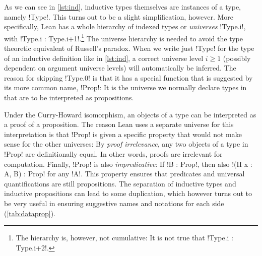 As we can see in \autoref{lst:ind}, inductive types themselves are instances of
a type, namely \lean!Type!. This turns out to be a slight simplification,
however. More specifically, Lean has a whole hierarchy of indexed types
or \emph{universes} \lean!Type.{i}!, with \lean!Type.{i} :
Type.{i+1}!.\footnote{The hierarchy is, however, not cumulative: It is not true
  that \lean!Type.{i} : Type.{i+2}!.} The universe hierarchy is needed to avoid
the type theoretic equivalent of Russell's paradox. When we write just
\lean!Type! for the type of an inductive definition like in \autoref{lst:ind},
a correct universe level $i \ge 1$
(possibly dependent on argument universe levels) will automatically be inferred.
The reason for skipping \lean!Type.{0}! is that it has a special function that
is suggested by its more common name, \lean!Prop!: It is the universe we normally
declare types in that are to be interpreted as propositions.

Under the Curry-Howard isomorphism, an objects of a type can be interpreted as
a proof of a proposition. The reason Lean uses a separate universe for this
interpretation is that \lean!Prop! is given a specific property that would not
make sense for the other universes: By \emph{proof irrelevance}, any two
objects of a type in \lean!Prop! are definitionally equal. In other words,
proofs are irrelevant for computation. Finally, \lean!Prop! is also
\emph{impredicative}: If \lean!B : Prop!, then also \lean!(Π x : A, B) : Prop!
for any \lean!A!. This property ensures that predicates and universal
quantifications are still propositions.
The separation of inductive types and inductive propositions can lead to some duplication, which
however turns out to be very useful in ensuring suggestive names and notations
for each side (\autoref{tab:dataprop}).

